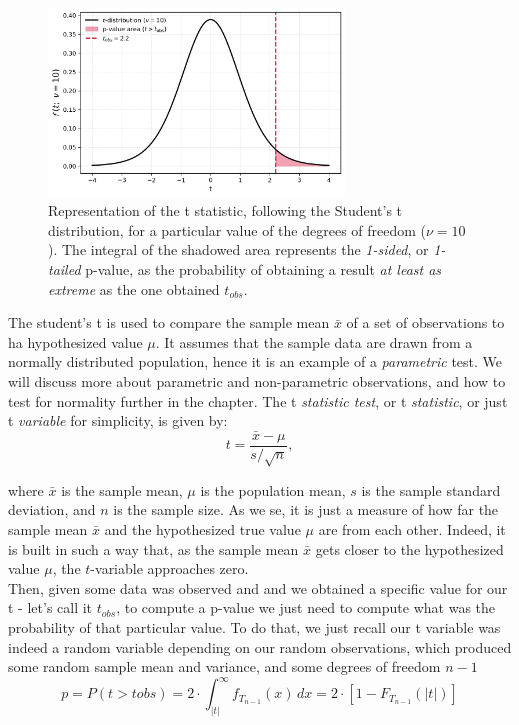 \documentclass{book}
\begin{document}
\begin{figure}[ht]
    \centering
    \includegraphics[width=0.7\textwidth]{figures/chapter4/t_test_1_sample_p_one_tailed.png}
    \caption{Representation of the t statistic, following the Student's t distribution, for a particular value of the degrees of freedom ($\nu = 10$). The integral of the shadowed area represents the \textit{1-sided}, or \textit{1-tailed} p-value, as the probability of obtaining a result \textit{at least as extreme} as the one obtained $t_{obs}$.}
    \label{fig:t_test1}
\end{figure}

The student's t is used to compare the sample mean $\bar{x}$ of a set of observations to ha hypothesized value $\mu$. It assumes that the sample data are drawn from a normally distributed population, hence it is an example of a \textit{parametric} test. We will discuss more about parametric and non-parametric observations, and how to test for normality further in the chapter. The t \textit{statistic test}, or t \textit{statistic}, or just t \textit{variable} for simplicity, is given by:
\begin{equation}
    t = \frac{\bar{x} - \mu}{s / \sqrt{n}},
\end{equation}

where $\bar{x}$ is the sample mean, $\mu$ is the population mean, $s$ is the sample standard deviation, and $n$ is the sample size. As we se, it is just a measure of how far the sample mean $\bar{x}$ and the hypothesized true value $\mu$ are from each other. Indeed, it is built in such a way that, as the sample mean $\bar{x}$ gets closer to the hypothesized value $\mu$, the $t$-variable approaches zero.\\

Then, given some data was observed and and we obtained a specific value for our t - let's call it \textit{$t_{obs}$}, to compute a p-value we just need to compute what was the probability of that particular value. To do that, we just recall our t variable was indeed a random variable depending on our random observations, which produced some random sample mean and variance, and some degrees of freedom $n - 1$
\begin{equation}
	p = P\left(t > t obs \right) = 2 \cdot \int_{|t|}^{\infty} f_{T_{n-1}}(x)\,dx = 2 \cdot \left[1 - F_{T_{n-1}}(|t|)\right]
\end{equation}
\end{document}
